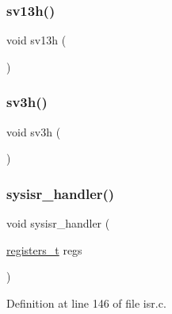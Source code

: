 \subsubsection{\texorpdfstring{sv13h()}{sv13h()}}
{\footnotesize\ttfamily void sv13h (\begin{DoxyParamCaption}{ }\end{DoxyParamCaption})}

\mbox{\label{a00101_ad118f86f4af40a3b4b94bc7c4977e762_ad118f86f4af40a3b4b94bc7c4977e762}} 
\subsubsection{\texorpdfstring{sv3h()}{sv3h()}}
{\footnotesize\ttfamily void sv3h (\begin{DoxyParamCaption}{ }\end{DoxyParamCaption})}

\mbox{\label{a00101_abd1fa375737cd5ecd84c082738e3b195_abd1fa375737cd5ecd84c082738e3b195}} 
\subsubsection{\texorpdfstring{sysisr\+\_\+handler()}{sysisr\_handler()}}
{\footnotesize\ttfamily void sysisr\+\_\+handler (\begin{DoxyParamCaption}\item[{\hyperlink{a00104_adf58dbaf6139b4957c348711f2026957_adf58dbaf6139b4957c348711f2026957}{registers\+\_\+t}}]{regs }\end{DoxyParamCaption})}



Definition at line 146 of file isr.\+c.


